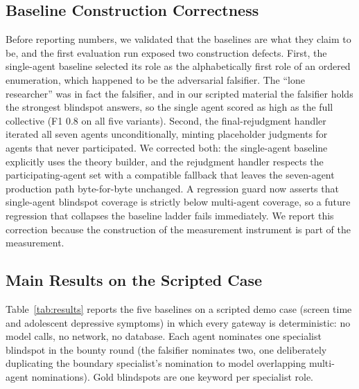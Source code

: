 \subsection{Baseline Construction Correctness}

Before reporting numbers, we validated that the baselines are what they claim
to be, and the first evaluation run exposed two construction defects. First,
the single-agent baseline selected its role as the alphabetically first role
of an ordered enumeration, which happened to be the adversarial falsifier.
The ``lone researcher'' was in fact the falsifier, and in our scripted
material the falsifier holds the strongest blindspot answers, so the single
agent scored as high as the full collective (F1 0.8 on all five variants).
Second, the final-rejudgment handler iterated all seven agents
unconditionally, minting placeholder judgments for agents that never
participated. We corrected both: the single-agent baseline explicitly uses
the theory builder, and the rejudgment handler respects the
participating-agent set with a compatible fallback that leaves the seven-agent
production path byte-for-byte unchanged. A regression guard now asserts that
single-agent blindspot coverage is strictly below multi-agent coverage, so a
future regression that collapses the baseline ladder fails immediately. We
report this correction because the construction of the measurement instrument
is part of the measurement.

\subsection{Main Results on the Scripted Case}

Table~\ref{tab:results} reports the five baselines on a scripted demo case
(screen time and adolescent depressive symptoms) in which every gateway is
deterministic: no model calls, no network, no database. Each agent nominates
one specialist blindspot in the bounty round (the falsifier nominates two,
one deliberately duplicating the boundary specialist's nomination to model
overlapping multi-agent nominations). Gold blindspots are one keyword per
specialist role.

